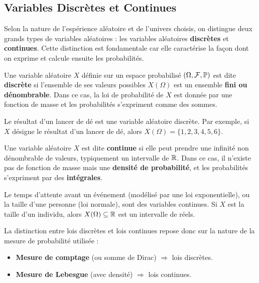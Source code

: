 \subsection{Variables Discrètes et Continues}

Selon la nature de l'espérience aléatoire et de l'univers choisis, on distingue deux grands types de variables aléatoires : 
les variables aléatoires \textbf{discrètes} et \textbf{continues}. Cette distinction est fondamentale car elle 
caractérise la façon dont on exprime et calcule ensuite les probabilités.

\begin{definition}
    Une variable aléatoire $X$ définie sur un espace probabilisé $(\Omega, \mathcal{F}, \mathbb{P})$ est dite 
    \textbf{discrète} si l'ensemble de ses valeurs possibles $X(\Omega)$ est un ensemble \textbf{fini ou dénombrable}. 
    Dans ce cas, la loi de probabilité de $X$ est donnée par une fonction de masse et les probabilités 
    s'expriment comme des sommes. 
\end{definition}

\begin{example}
    Le résultat d'un lancer de dé est une variable aléatoire discrète. 
    Par exemple, si $X$ désigne le résultat d’un lancer de dé, alors $X(\Omega) = \{1,2,3,4,5,6\}$.
\end{example}

\begin{definition}
    Une variable aléatoire $X$ est dite \textbf{continue} si elle peut prendre une infinité non dénombrable de valeurs, typiquement un intervalle de $\mathbb{R}$. 
    Dans ce cas, il n'existe pas de fonction de masse mais une \textbf{densité de probabilité}, et les probabilités s'expriment 
    par des \textbf{intégrales}.
\end{definition}

\begin{example}
    Le temps d'attente avant un événement (modélisé par une loi exponentielle), ou la taille d'une personne (loi normale), 
    sont des variables continues. Si $X$ est la taille d’un individu, alors $X(\Omega) \subseteq \mathbb{R}$ est un intervalle de réels.
\end{example}

\begin{remark}
    La distinction entre lois discrètes et lois continues repose donc sur la nature de la mesure de probabilité utilisée :
    \begin{itemize}
        \item \textbf{Mesure de comptage} (ou somme de Dirac) $\Rightarrow$ lois discrètes.
        \item \textbf{Mesure de Lebesgue} (avec densité) $\Rightarrow$ lois continues.
    \end{itemize}
\end{remark}

